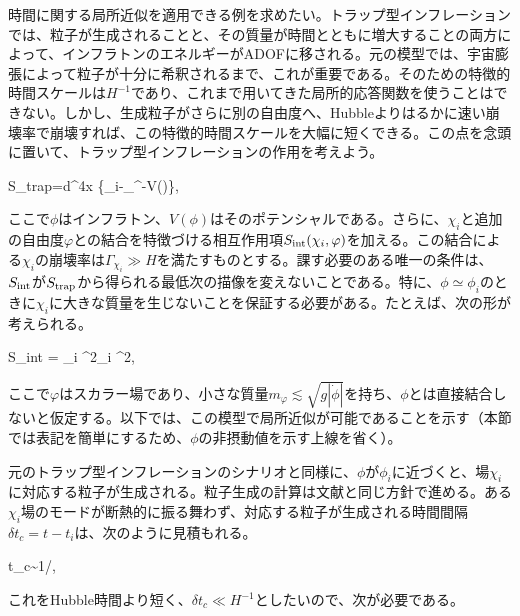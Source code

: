 \label{localtrap}

時間に関する局所近似を適用できる例を求めたい。トラップ型インフレーションでは、粒子が生成されることと、その質量が時間とともに増大することの両方によって、インフラトンのエネルギーがADOFに移される。元の模型では、宇宙膨張によって粒子が十分に希釈されるまで、これが重要である。そのための特徴的時間スケールは$H^{-1}$であり、これまで用いてきた局所的応答関数を使うことはできない。しかし、生成粒子がさらに別の自由度へ、Hubbleよりはるかに速い崩壊率で崩壊すれば、この特徴的時間スケールを大幅に短くできる。この点を念頭に置いて、トラップ型インフレーションの作用を考えよう。

\beq \label{seftrap} S_{\rm trap}=\int d^4x \left\{\sum_i-\partial_{\mu}\phi\partial^{\mu}\phi-V(\phi)\right\},\eeq

ここで$\phi$はインフラトン、$V(\phi)$はそのポテンシャルである。さらに、$\chi_i$と追加の自由度$\varphi$との結合を特徴づける相互作用項$S_{\rm int}(\chi_i,\varphi)$を加える。この結合による$\chi_i$の崩壊率は$\Gamma_{\chi_i}\gg H$を満たすものとする。課す必要のある唯一の条件は、$S_{\rm int}$が$S_{\rm trap}$から得られる最低次の描像を変えないことである。特に、$\phi\simeq\phi_i$のときに$\chi_i$に大きな質量を生じないことを保証する必要がある。たとえば、次の形が考えられる。

\beq
\label{decayr}
S_{\rm int} =  \sum_i  \partial^2\chi_i \varphi^2,
\eeq

ここで$\varphi$はスカラー場であり、小さな質量$m_\varphi\lesssim\sqrt{g|\dot\phi|}$を持ち、$\phi$とは直接結合しないと仮定する。以下では、この模型で局所近似が可能であることを示す（本節では表記を簡単にするため、$\phi$の非摂動値を示す上線を省く）。

元のトラップ型インフレーションのシナリオと同様に、$\phi$が$\phi_i$に近づくと、場$\chi_i$に対応する粒子が生成される。粒子生成の計算は文献\cite{trapped,beauty}と同じ方針で進める。ある$\chi_i$場のモードが断熱的に振る舞わず、対応する粒子が生成される時間間隔$\delta t_c=t-t_i$は、次のように見積もれる。

\be \delta t_c\sim 1/,\ee

これをHubble時間より短く、$\delta t_c\ll H^{-1}$としたいので、次が必要である\cite{trapped}。

